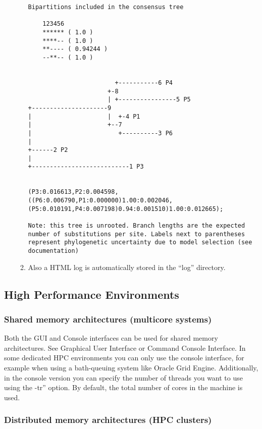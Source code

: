 \documentclass[11pt,twoside,a4paper]{article}
\begin{document}
\begin{enumerate}
\begin{enumerate}
\begin{lstlisting}
Bipartitions included in the consensus tree
 
    123456
    ****** ( 1.0 )
    ****-- ( 1.0 )
    **---- ( 0.94244 )
    --**-- ( 1.0 )

 
                        +-----------6 P4
                      +-8
                      | +----------------5 P5
+---------------------9
|                     |  +-4 P1
|                     +--7
|                        +----------3 P6
|
+------2 P2
|
+---------------------------1 P3

 
(P3:0.016613,P2:0.004598,((P6:0.006790,P1:0.000000)1.00:0.002046,(P5:0.010191,P4:0.007198)0.94:0.001510)1.00:0.012665);
 
Note: this tree is unrooted. Branch lengths are the expected number of substitutions per site. Labels next to parentheses represent phylogenetic uncertainty due to model selection (see documentation)
\end{lstlisting}

\item Also a HTML log is automatically stored in the ``log'' directory.

\end{enumerate}
\end{enumerate}

\subsection{High Performance Environments}

\subsubsection{Shared memory architectures (multicore systems)}

Both the GUI and Console interfaces can be used for shared memory architectures. See Graphical User Interface or Command Console Interface. In some dedicated HPC environments you can only use the console interface, for example when using a bath-queuing system like Oracle Grid Engine. Additionally, in the console version you can specify the number of threads you want to use using the -tr'' option. By default, the total number of cores in the machine is used.

\subsubsection{Distributed memory architectures (HPC clusters)}
\end{document}
